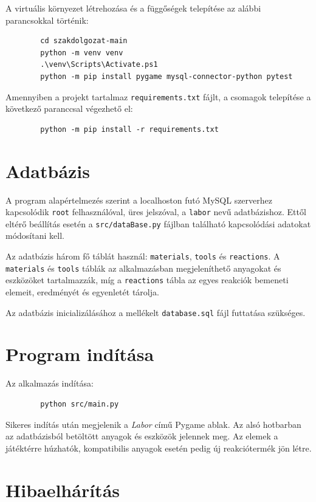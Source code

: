\documentclass[]{thesis-ekf}
\begin{document}
	A virtuális környezet létrehozása és a függőségek telepítése az alábbi parancsokkal történik:
	
	\begin{verbatim}
		cd szakdolgozat-main
		python -m venv venv
		.\venv\Scripts\Activate.ps1
		python -m pip install pygame mysql-connector-python pytest
	\end{verbatim}
	
	Amennyiben a projekt tartalmaz \texttt{requirements.txt} fájlt, a csomagok telepítése a következő paranccsal végezhető el:
	
	\begin{verbatim}
		python -m pip install -r requirements.txt
	\end{verbatim}
	
	\section{Adatbázis}
	
	A program alapértelmezés szerint a localhoston futó MySQL szerverhez kapcsolódik \texttt{root} felhasználóval, üres jelszóval, a \texttt{labor} nevű adatbázishoz. Ettől eltérő beállítás esetén a \texttt{src/dataBase.py} fájlban található kapcsolódási adatokat módosítani kell.
	
	Az adatbázis három fő táblát használ: \texttt{materials}, \texttt{tools} és \texttt{reactions}. A \texttt{materials} és \texttt{tools} táblák az alkalmazásban megjeleníthető anyagokat és eszközöket tartalmazzák, míg a \texttt{reactions} tábla az egyes reakciók bemeneti elemeit, eredményét és egyenletét tárolja.
	
	Az adatbázis inicializálásához a mellékelt \texttt{database.sql} fájl futtatása szükséges.
	
	\section{Program indítása}
	
	Az alkalmazás indítása:
	
	\begin{verbatim}
		python src/main.py
	\end{verbatim}
	
	Sikeres indítás után megjelenik a \textit{Labor} című Pygame ablak. Az alsó hotbarban az adatbázisból betöltött anyagok és eszközök jelennek meg. Az elemek a játéktérre húzhatók, kompatibilis anyagok esetén pedig új reakciótermék jön létre.
	
	\section{Hibaelhárítás}
	
\end{document}
